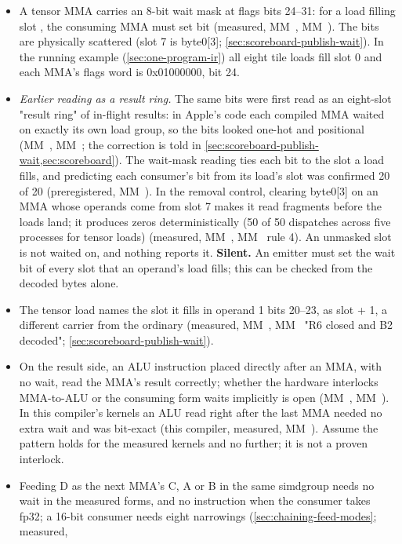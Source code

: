 \begin{itemize}
\item A tensor MMA carries an 8-bit wait mask at flags bits 24–31: for a load filling slot , the consuming MMA must
  set bit  (measured, MM~, MM~). The bits are physically scattered (slot 7 is
  byte0{[}3{]}; \cref{sec:scoreboard-publish-wait}). In the running example (\cref{sec:one-program-ir}) all eight tile loads fill slot 0 and each MMA's
  flags word is 0x01000000, bit 24.
\item \emph{Earlier reading as a result ring.} The same bits were first read as an eight-slot
  "result ring" of in-flight results: in Apple's code each compiled MMA waited on exactly its own load group, so the bits
  looked one-hot and positional (MM~, MM~; the correction is told in \cref{sec:scoreboard-publish-wait,sec:scoreboard}).
  The wait-mask reading ties each bit to the slot a load fills, and predicting each consumer's bit from its load's slot
  was confirmed 20 of 20 (preregistered, MM~). In the removal control, clearing byte0{[}3{]} on an
  MMA whose operands come from slot 7 makes it read fragments before the loads land; it produces zeros
  deterministically (50 of 50 dispatches across five processes for tensor loads) (measured, MM~, MM~ rule 4).
  An unmasked slot is not waited on, and nothing reports it. \textbf{Silent.} An emitter must set the wait bit of every
  slot that an operand's load fills; this can be checked from the decoded bytes alone.
\item The tensor load names the slot it fills in operand 1 bits 20–23, as slot + 1, a different carrier from the ordinary
   (measured, MM~, MM~ "R6 closed and B2 decoded"; \cref{sec:scoreboard-publish-wait}).
\item On the result side, an ALU instruction placed directly after an MMA, with no wait, read the MMA's result correctly;
  whether the hardware interlocks MMA-to-ALU or the consuming form waits implicitly is open (MM~, MM~). In
  this compiler's kernels an ALU read right after the last MMA needed no extra wait and was bit-exact (this compiler, measured,
  MM~). Assume the pattern holds for the measured kernels and no further; it is not a proven interlock.
\item Feeding D as the next MMA's C, A or B in the same simdgroup needs no wait in the measured forms, and no
  instruction when the consumer takes fp32; a 16-bit consumer needs eight narrowings (\cref{sec:chaining-feed-modes}; measured,

\end{itemize}
